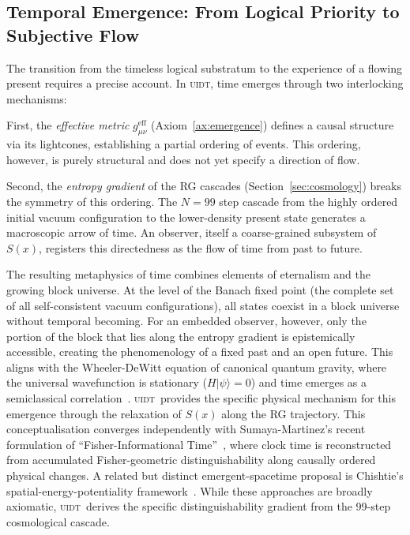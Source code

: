 \documentclass[12pt,a4paper,twoside]{article}
\theoremstyle{plain}
\theoremstyle{definition}
\theoremstyle{remark}
\newcommand{\UIDT}{\textsc{uidt}}
\begin{document}
\subsection{Temporal Emergence: From Logical Priority to Subjective Flow}
\label{subsec:time-emergence}

The transition from the timeless logical substratum to the experience of a
flowing present requires a precise account. In \UIDT, time emerges through two
interlocking mechanisms:

First, the \emph{effective metric} $g_{\mu\nu}^{\mathrm{eff}}$ (Axiom~\ref{ax:emergence})
defines a causal structure via its lightcones, establishing a partial ordering
of events. This ordering, however, is purely structural and does not yet specify
a direction of flow.

Second, the \emph{entropy gradient} of the RG cascades (Section~\ref{sec:cosmology})
breaks the symmetry of this ordering. The $N=99$ step cascade from the highly
ordered initial vacuum configuration to the lower-density present state
generates a macroscopic arrow of time. An observer, itself a coarse-grained
subsystem of $S(x)$, registers this directedness as the flow of time from past
to future.

The resulting metaphysics of time combines elements of eternalism and the
growing block universe. At the level of the Banach fixed point (the complete
set of all self-consistent vacuum configurations), all states coexist in a
block universe without temporal becoming. For an embedded observer, however,
only the portion of the block that lies along the entropy gradient is
epistemically accessible, creating the phenomenology of a fixed past and an
open future. This aligns with the Wheeler-DeWitt equation of canonical quantum
gravity, where the universal wavefunction is stationary ($H|\psi\rangle = 0$)
and time emerges as a semiclassical correlation~\cite{DeWitt1967}. \UIDT\
provides the specific physical mechanism for this emergence through the
relaxation of $S(x)$ along the RG trajectory. This conceptualisation converges
independently with Sumaya-Martinez's recent formulation of
``Fisher-Informational Time''~\cite{SumayaMartinez2026FisherTime},
where clock time is reconstructed from accumulated Fisher-geometric
distinguishability along causally ordered physical changes. A related but
distinct emergent-spacetime proposal is Chishtie's spatial-energy-potentiality
framework~\cite{Chishtie2025EmergentSpacetime}. While these approaches are
broadly axiomatic, \UIDT\ derives the specific distinguishability gradient from
the 99-step cosmological cascade.
\end{document}
